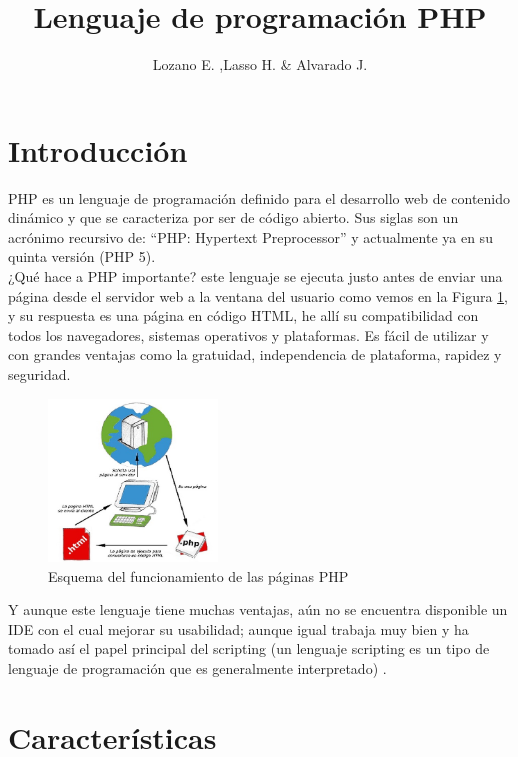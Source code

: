 \documentclass[11pt]{article} %
\title{Lenguaje de programación PHP}
\author{Lozano E. ,Lasso H. \& Alvarado J.}
\begin{document}
\maketitle

\section{Introducción}
PHP es un lenguaje de programación definido para el desarrollo web de contenido dinámico y que se caracteriza por ser de código abierto. Sus siglas son un acrónimo recursivo de: ``PHP: Hypertext Preprocessor'' y actualmente ya en su quinta versión (PHP 5).
\\¿Qué hace a PHP importante? este lenguaje se ejecuta justo antes de enviar una página desde el servidor web a la ventana del usuario como vemos en la Figura \ref{fig:funcionamiento}, y su respuesta es una página en código HTML, he allí su compatibilidad con todos los navegadores, sistemas operativos y plataformas.  Es fácil de utilizar y con grandes ventajas como la gratuidad, independencia de plataforma, rapidez y seguridad. 

\begin{figure}[H]
  \centering
    \includegraphics[width=0.4\textwidth]{Imagenes/diagrama-php}
  \caption{Esquema del funcionamiento de las páginas PHP}
  \label{fig:funcionamiento}
\end{figure}
 Y aunque este lenguaje tiene muchas ventajas, aún no se encuentra disponible un IDE con el cual mejorar su usabilidad; aunque igual trabaja muy bien y ha tomado así el papel principal del scripting (un lenguaje scripting es un tipo de lenguaje de programación que es generalmente interpretado) \cite{[1]}.

\section{Características}
\end{document}
